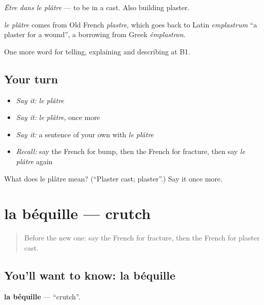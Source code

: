 \emph{Être dans le plâtre} — to be in a cast. Also building plaster.

\begin{cousinweb}
\emph{le plâtre} comes from Old French \emph{plastre}, which goes back to Latin \emph{emplastrum} \textquotedblleft{}a plaster for a wound\textquotedblright{}, a borrowing from Greek \emph{émplastron}.
\end{cousinweb}

\begin{grammarlens}[title={What you've built}]
One more word for telling, explaining and describing at B1.
\end{grammarlens}

\subsection*{Your turn}
\begin{itemize}
\raggedright
  \item \emph{Say it:} \emph{le plâtre}
  \item \emph{Say it:} \emph{le plâtre}, once more
  \item \emph{Say it:} a sentence of your own with \emph{le plâtre}
  \item \emph{Recall:} say the French for bump, then the French for fracture, then say \emph{le plâtre} again
\end{itemize}

\begin{tcolorbox}[breakable,colback=teal!4,colframe=teal!35!black,title={Before you move on}]
What does le plâtre mean? (\textquotedblleft{}Plaster cast; plaster\textquotedblright{}.) Say it once more.
\end{tcolorbox}
\section[la béquille]{la béquille — crutch}

\label{lesson:FR-C480-bequille}



\begin{quote}
Before the new one: say the French for fracture, then the French for plaster cast.
\end{quote}

\subsection*{You'll want to know: la béquille}
\textbf{la béquille} — \textquotedblleft{}crutch\textquotedblright{}.

